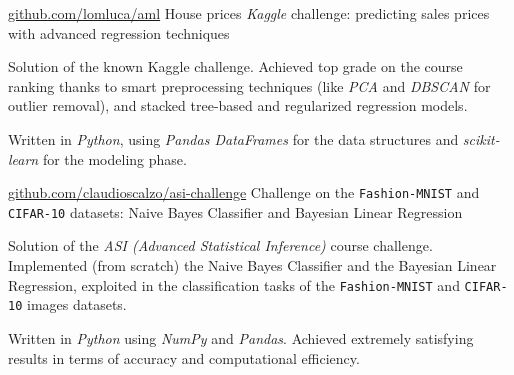 \begin{cventries}
	\cvproj
		{\href{https://github.com/lomluca/aml}{github.com/lomluca/aml}}
		{House prices \textit{Kaggle} challenge: predicting sales prices with advanced regression techniques}
		{}
		{}
		{
			\begin{cvitems} %
				\item {Solution of the known Kaggle challenge. Achieved top grade on the course ranking thanks to smart preprocessing techniques (like \textit{PCA} and \textit{DBSCAN} for outlier removal), and stacked tree-based and regularized regression models.}
				\item {Written in \textit{Python}, using \textit{Pandas DataFrames} for the data structures and \textit{scikit-learn} for the modeling phase.}
			\end{cvitems}
		}
	
	\cvproj
		{\href{https://github.com/claudioscalzo/asi-challenge}{github.com/claudioscalzo/asi-challenge}}
		{Challenge on the \texttt{Fashion-MNIST} and \texttt{CIFAR-10} datasets: Naive Bayes Classifier and Bayesian Linear Regression}
		{}
		{}
		{
			\begin{cvitems} %
				\item {Solution of the \textit{ASI (Advanced Statistical Inference)} course challenge. Implemented (from scratch) the Naive Bayes Classifier and the Bayesian Linear Regression, exploited in the classification tasks of the \texttt{Fashion-MNIST} and \texttt{CIFAR-10} images datasets.}
				\item {Written in \textit{Python} using \textit{NumPy} and \textit{Pandas}. Achieved extremely satisfying results in terms of accuracy and computational efficiency.}
			\end{cvitems}
		}
\end{cventries}
